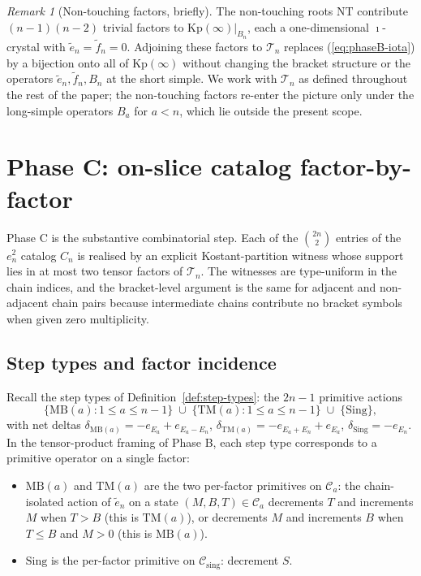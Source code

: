 \documentclass[11pt]{article}
\theoremstyle{definition}
\theoremstyle{remark}
\newtheorem{remark}[theorem]{Remark}
\newcommand{\Kp}{\mathrm{Kp}}
\newcommand{\NT}{\mathrm{NT}}
\newcommand{\Sing}{\mathrm{Sing}}
\newcommand{\MB}{\mathrm{MB}}
\newcommand{\TM}{\mathrm{TM}}
\newcommand{\Cmid}{\mathcal{C}}
\newcommand{\Csing}{\mathcal{C}_{\mathrm{sing}}}
\newcommand{\TT}{\mathcal{T}}
\begin{document}
\begin{remark}[Non-touching factors, briefly]\label{rmk:non-touching-phaseB}
The non-touching roots $\NT$ contribute
$(n-1)(n-2)$ trivial factors to $\Kp(\infty)|_{B_n}$, each a one-dimensional
$\imath$-crystal with $\tilde e_n = \tilde f_n = 0$. Adjoining these factors to
$\TT_n$ replaces (\ref{eq:phaseB-iota}) by a bijection onto all of $\Kp(\infty)$
without changing the bracket structure or the operators $\tilde e_n, \tilde f_n,
B_n$ at the short simple. We work with $\TT_n$ as defined throughout the rest of
the paper; the non-touching factors re-enter the picture only under the
long-simple operators $B_a$ for $a < n$, which lie outside the present scope.
\end{remark}

\section{Phase C: on-slice catalog factor-by-factor}\label{sec:phaseC}

Phase C is the substantive combinatorial step. Each of the $\binom{2n}{2}$ entries
of the $e_n^2$ catalog $C_n$ is realised by an explicit Kostant-partition witness
whose support lies in at most two tensor factors of $\TT_n$. The witnesses are
type-uniform in the chain indices, and the bracket-level argument is the same for
adjacent and non-adjacent chain pairs because intermediate chains contribute no
bracket symbols when given zero multiplicity.

\subsection{Step types and factor incidence}\label{ssec:step-incidence}

Recall the step types of Definition~\ref{def:step-types}: the $2n - 1$ primitive
actions
\[
\{\MB(a) : 1 \leq a \leq n - 1\} \;\cup\; \{\TM(a) : 1 \leq a \leq n - 1\} \;\cup\; \{\Sing\},
\]
with net deltas $\delta_{\MB(a)} = -e_{E_a} + e_{E_a - E_n}$, $\delta_{\TM(a)} =
-e_{E_a + E_n} + e_{E_a}$, $\delta_{\Sing} = -e_{E_n}$. In the tensor-product
framing of Phase B, each step type corresponds to a primitive operator on a single
factor:

\begin{itemize}[leftmargin=2em]
  \item $\MB(a)$ and $\TM(a)$ are the two per-factor primitives on $\Cmid_a$: the
    chain-isolated action of $\tilde e_n$ on a state $(M, B, T) \in \Cmid_a$
    decrements $T$ and increments $M$ when $T > B$ (this is $\TM(a)$), or
    decrements $M$ and increments $B$ when $T \leq B$ and $M > 0$ (this is
    $\MB(a)$).
  \item $\Sing$ is the per-factor primitive on $\Csing$: decrement $S$.
\end{itemize}
\end{document}
